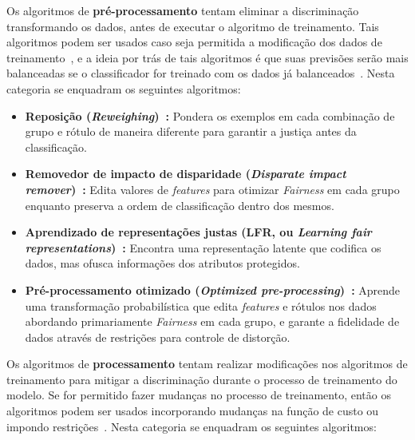 \documentclass[portugues]{ic-tese}
\begin{document}
Os algoritmos de \textbf{pré-processamento} tentam eliminar a discriminação transformando os dados, antes de executar o algoritmo de treinamento. Tais algoritmos podem ser usados caso seja permitida a modificação dos dados de treinamento~\citep{dAlessandro_2017}, e a ideia por trás de tais algoritmos é que suas previsões serão mais balanceadas se o classificador for treinado com os dados já balanceados~\citep{Kamiran_2009}. Nesta categoria se enquadram os seguintes algoritmos:

\begin{itemize}
\item \textbf{Reposição (\textit{Reweighing})~\citep{Kamiran_2011}:} Pondera os exemplos em cada combinação de grupo e rótulo de maneira diferente para garantir a justiça antes da classificação.

\item \textbf{Removedor de impacto de disparidade (\textit{Disparate impact remover})~\citep{Feldman_2015}:} Edita valores de \textit{features} para otimizar \textit{Fairness} em cada grupo enquanto preserva a ordem de classificação dentro dos mesmos.

\item \textbf{Aprendizado de representações justas (LFR, ou \textit{Learning fair representations})~\citep{Zemel_2013}:} Encontra uma representação latente que codifica os dados, mas ofusca informações dos atributos protegidos.

\item \textbf{Pré-processamento otimizado (\textit{Optimized pre-processing})~\citep{Calmon_2017}:} Aprende uma transformação probabilística que edita \textit{features} e rótulos nos dados abordando primariamente \textit{Fairness} em cada grupo, e garante a fidelidade de dados através de restrições para controle de distorção.
\end{itemize}

Os algoritmos de \textbf{processamento} tentam realizar modificações nos algoritmos de treinamento para mitigar a discriminação durante o processo de treinamento do modelo. Se for permitido fazer mudanças no processo de treinamento, então os algoritmos podem ser usados incorporando mudanças na função de custo ou impondo restrições~\citep{Mehrabi_2021}. Nesta categoria se enquadram os seguintes algoritmos:
\end{document}
